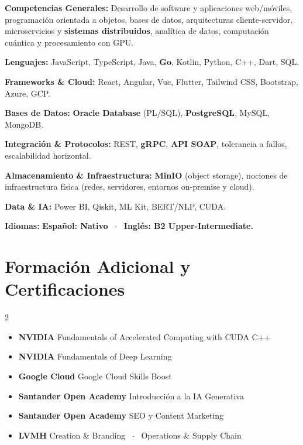 \documentclass[10pt, letterpaper]{article}
\begin{document}
{\small
\noindent\textbf{\color{darkgray}Competencias Generales:}
\textcolor{midgray}{Desarrollo de software y aplicaciones web/m\'oviles, programaci\'on orientada a objetos, bases de datos, arquitecturas cliente-servidor, microservicios y \textbf{sistemas distribuidos}, anal\'itica de datos, computaci\'on cu\'antica y procesamiento con GPU.}

\noindent\textbf{\color{darkgray}Lenguajes:}
\textcolor{midgray}{JavaScript, TypeScript, Java, \textbf{Go}, Kotlin, Python, C++, Dart, SQL.}

\noindent\textbf{\color{darkgray}Frameworks \& Cloud:}
\textcolor{midgray}{React, Angular, Vue, Flutter, Tailwind CSS, Bootstrap, Azure, GCP.}

\noindent\textbf{\color{darkgray}Bases de Datos:}
\textcolor{midgray}{\textbf{Oracle Database} (PL/SQL), \textbf{PostgreSQL}, MySQL, MongoDB.}

\noindent\textbf{\color{darkgray}Integraci\'on \& Protocolos:}
\textcolor{midgray}{REST, \textbf{gRPC}, \textbf{API SOAP}, tolerancia a fallos, escalabilidad horizontal.}

\noindent\textbf{\color{darkgray}Almacenamiento \& Infraestructura:}
\textcolor{midgray}{\textbf{MinIO} (object storage), nociones de infraestructura f\'isica (redes, servidores, entornos on-premise y cloud).}

\noindent\textbf{\color{darkgray}Data \& IA:}
\textcolor{midgray}{Power BI, Qiskit, ML Kit, BERT/NLP, CUDA.}

\noindent\textbf{\color{darkgray}Idiomas:}
\textbf{\color{lightaccent}Espa\~nol: Nativo} \ $\cdot$ \ \textbf{\color{lightaccent}Ingl\'es: B2 Upper-Intermediate.}
}

\section{Formaci\'on Adicional y Certificaciones}

\begin{multicols}{2}
\small
\begin{itemize}
    \item \textbf{NVIDIA} \textemdash{} Fundamentals of Accelerated Computing with CUDA C++
    \item \textbf{NVIDIA} \textemdash{} Fundamentals of Deep Learning
    \item \textbf{Google Cloud} \textemdash{} Google Cloud Skills Boost
    \item \textbf{Santander Open Academy} \textemdash{} Introducci\'on a la IA Generativa
    \item \textbf{Santander Open Academy} \textemdash{} SEO y Content Marketing
    \item \textbf{LVMH} \textemdash{} Creation \& Branding \ $\cdot$ \ Operations \& Supply Chain
\end{itemize}
\end{multicols}
\end{document}
